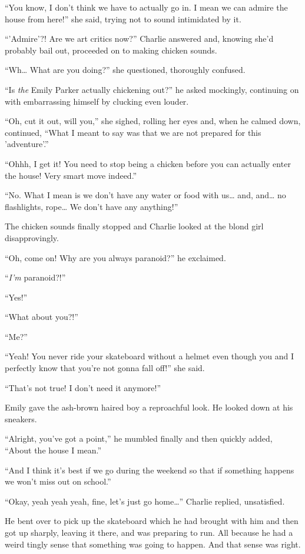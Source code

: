“You know, I don't think we have to actually go in. I mean we can admire the house from here!” she said, trying not to sound intimidated by it.

“'Admire'?! Are we art critics now?” Charlie answered and, knowing she'd probably bail out, proceeded on to making chicken sounds.

“Wh… What are you doing?” she questioned, thoroughly confused.

“Is \textit{the} Emily Parker actually chickening out?” he asked mockingly, continuing on with embarrassing himself by clucking even louder.

“Oh, cut it out, will you,” she sighed, rolling her eyes and, when he calmed down, continued, “What I meant to say was that we are not prepared for this 'adventure'.”

“Ohhh, I get it! You need to stop being a chicken before you can actually enter the house! Very smart move indeed.”

“No. What I mean is we don't have any water or food with us… and, and… no flashlights, rope… We don't have any anything!”

The chicken sounds finally stopped and Charlie looked at the blond girl disapprovingly.

“Oh, come on! Why are you always paranoid?” he exclaimed.

“\textit{I'm} paranoid?!”

“Yes!”

“What about you?!”

“Me?”

“Yeah! You never ride your skateboard without a helmet even though you and I perfectly know that you're not gonna fall off!” she said.

“That's not true! I don't need it anymore!”

Emily gave the ash-brown haired boy a reproachful look. He looked down at his sneakers.

“Alright, you've got a point,” he mumbled finally and then quickly added, “About the house I mean.”

“And I think it's best if we go during the weekend so that if something happens we won't miss out on school.”

“Okay, yeah yeah yeah, fine, let's just go home…” Charlie replied, unsatisfied.

He bent over to pick up the skateboard which he had brought with him and then got up sharply, leaving it there, and was preparing to run. All because he had a weird tingly sense that something was going to happen. And that sense was right.

